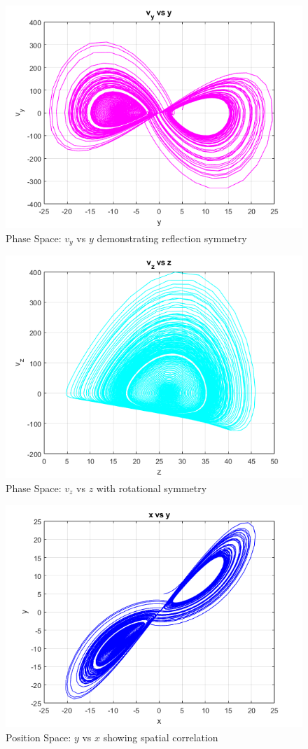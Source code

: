 \documentclass[%
reprint,
amsmath,amssymb,
aps,
floatfix,
]{revtex4-2}
\begin{document}
	\begin{figure}[htbp]
		\centering
		\includegraphics[width=0.8\linewidth]{v_y_vs_y.png}
		\caption{Phase Space: $v_y$ vs $y$ demonstrating reflection symmetry}
		\label{fig:vy_y}
	\end{figure}
	
	\begin{figure}[htbp]
		\centering
		\includegraphics[width=0.8\linewidth]{v_z_vs_z.png}
		\caption{Phase Space: $v_z$ vs $z$ with rotational symmetry}
		\label{fig:vz_z}
	\end{figure}
	
	\begin{figure}[htbp]
		\centering
		\includegraphics[width=0.8\linewidth]{y_vs_x.png}
		\caption{Position Space: $y$ vs $x$ showing spatial correlation}
		\label{fig:y_x}
	\end{figure}
	
\end{document}
